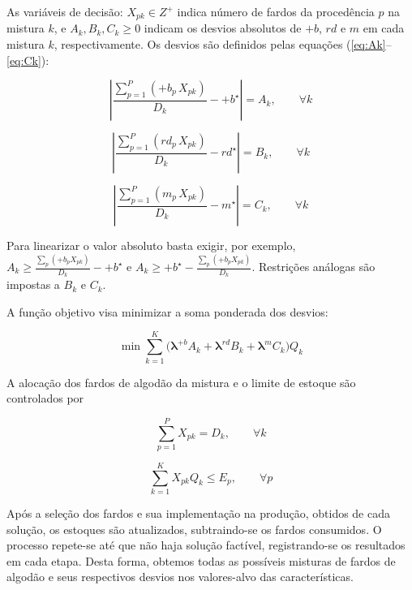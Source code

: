 \documentclass[a4paper,12pt]{article}
\begin{document}
As variáveis de decisão: $X_{pk} \in Z^+$ indica número de fardos da procedência \(p\) na mistura \(k\), e \(A_k,B_k,C_k\ge0\) indicam os desvios absolutos de \(+b\), \(rd\) e \(m\) em cada mistura $k$, respectivamente.  Os desvios são definidos pelas equações (\ref{eq:Ak}–\ref{eq:Ck}):

\begin{equation}\label{eq:Ak}
\left|\frac{\sum_{p=1}^{P} (+b_p\,X_{pk})}{D_k}-+b^{\!\star}\right| = A_k, \qquad \forall k
\end{equation}

\begin{equation}\label{eq:Bk}
\left|\frac{\sum_{p=1}^{P} (rd_p\,X_{pk})}{D_k}-rd^{\!\star}\right| = B_k, \qquad \forall k
\end{equation}

\begin{equation}\label{eq:Ck}
\left|\frac{\sum_{p=1}^{P} (m_p\,X_{pk})}{D_k}-m^{\!\star}\right| = C_k, \qquad \forall k
\end{equation}

Para linearizar o valor absoluto basta exigir, por exemplo,  
\(A_k \ge \tfrac{\sum_p (+b_p X_{pk})}{D_k}-+b^{\!\star}\) e  
\(A_k \ge +b^{\!\star}-\tfrac{\sum_p (+b_p X_{pk})}{D_k}\). Restrições análogas são impostas a \(B_k\) e \(C_k\).

A função objetivo visa minimizar a soma ponderada dos desvios:

\begin{equation}\label{eq:obj}
\min \sum_{k=1}^{K} \bigl(\boldsymbol{\lambda}^{+b}A_k+\boldsymbol{\lambda}^{rd}B_k+\boldsymbol{\lambda}^{m}C_k\bigr)Q_k
\end{equation}

A alocação dos fardos de algodão da mistura e o limite de estoque são controlados por

\begin{equation}
\sum_{p=1}^{P} X_{pk} = D_k, \qquad \forall k\label{eq:mix}
\end{equation}

\begin{equation}\label{eq:stock}
\sum_{k=1}^{K} X_{pk}Q_k \le E_p, \qquad \forall p
\end{equation}

Após a seleção dos fardos e sua implementação na produção, obtidos de cada solução, os estoques são atualizados, subtraindo-se os fardos consumidos. O processo repete-se até que não haja solução factível, registrando-se os resultados em cada etapa. Desta forma, obtemos todas as possíveis misturas de fardos de algodão e seus respectivos desvios nos valores-alvo das características. 
\end{document}
